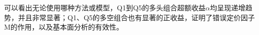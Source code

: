 可以看出无论使用哪种方法或模型，Q1到Q5的多头组合超额收益$\alpha$均呈现递增趋势，并且非常显著；Q1、Q5的多空组合也有显著的正收益，证明了错误定价因子M的作用，以及基本面分析的有效性。



